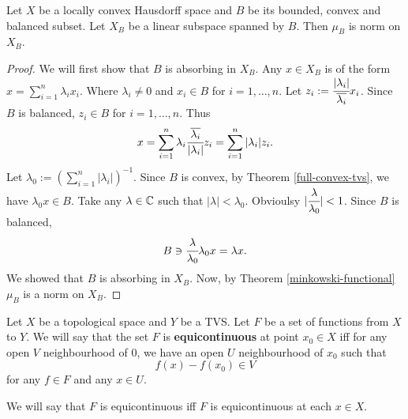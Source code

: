 \documentclass[main.tex]{subfiles}
\begin{document}
\begin{theorem}
Let $X$ be a locally convex Hausdorff space and $B$ be its bounded, convex and balanced subset. Let $X_B$ be a linear subspace spanned by $B$. Then $\mu_B$ is norm on $X_B$.
\end{theorem}
\begin{proof}
We will first show that $B$ is absorbing in $X_B$. Any $x\in X_B$ is of the form $x = \sum_{i=1}^n \lambda_i x_i$. Where $\lambda_i\not = 0$ and $x_i\in B$ for $i=1,\dots, n$. Let $z_i := \cfrac{|\lambda_i|}{\overline{\lambda_i}} x_i$. Since $B$ is balanced, $z_i\in B$ for $i=1, \dots, n$. Thus
\begin{equation}
x = \sum_{i=1}^n \lambda_i \cfrac{\overline{\lambda_i}}{|\lambda_i|} z_i = \sum_{i=1}^n |\lambda_i| z_i.
\end{equation}
Let $\lambda_0 := (\sum_{i=1}^n |\lambda_i|)^{-1}$. Since $B$ is convex, by Theorem \ref{full-convex-tvs}, we have $\lambda_0 x\in B$. Take any $\lambda\in \mathbb{C}$ such that $|\lambda| < \lambda_0$. Obvioulsy $|\cfrac{\lambda}{\lambda_0}| < 1$. Since $B$ is balanced,
\begin{equation}
B \ni \cfrac{\lambda}{\lambda_0} \lambda_0 x = \lambda x.
\end{equation}
We showed that $B$ is absorbing in $X_B$. Now, by Theorem \ref{minkowski-functional} $\mu_B$ is a norm on $X_B$.
\end{proof}

\begin{definition}
Let $X$ be a topological space and $Y$ be a TVS. Let $F$ be a set of functions from $X$ to $Y$. We will say that the set $F$ is \textbf{equicontinuous} at point $x_0\in X$ iff for any open $V$ neighbourhood of $0$, we have an open $U$ neighbourhood of $x_0$ such that 
\begin{equation}
f(x) - f(x_0)\in V 
\end{equation}
for any $f\in F$ and any $x\in U$.
\end{definition}

We will say that $F$ is equicontinuous iff $F$ is equicontinuous at each $x\in X$.
\end{document}
